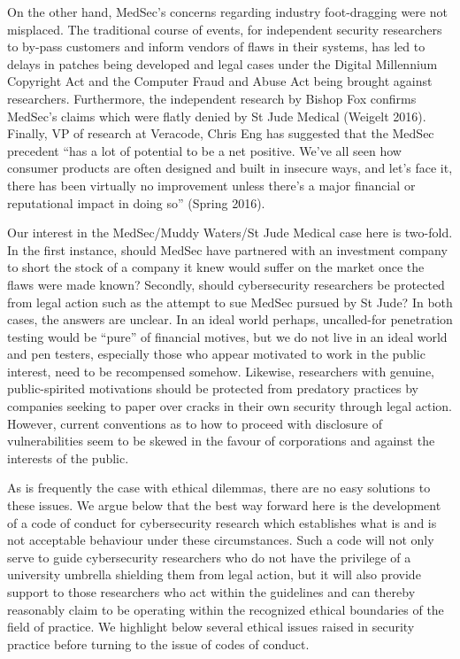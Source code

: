 \documentclass{svjour3}                     %
\begin{document}
On the other hand, MedSec’s concerns regarding industry foot-dragging were not misplaced. The traditional course of events, for independent security researchers to by-pass customers and inform vendors of flaws in their systems, has led to delays in patches being developed and legal cases under the Digital Millennium Copyright Act and the Computer Fraud and Abuse Act being brought against researchers. Furthermore, the independent research by Bishop Fox confirms MedSec’s claims which were flatly denied by St Jude Medical (Weigelt 2016). Finally, VP of research at Veracode, Chris Eng has suggested that the MedSec precedent “has a lot of potential to be a net positive. We’ve all seen how consumer products are often designed and built in insecure ways, and let’s face it, there has been virtually no improvement unless there’s a major financial or reputational impact in doing so” (Spring 2016).

Our interest in the MedSec/Muddy Waters/St Jude Medical case here is two-fold. In the first instance, should MedSec have partnered with an investment company to short the stock of a company it knew would suffer on the market once the flaws were made known? Secondly, should cybersecurity researchers be protected from legal action such as the attempt to sue MedSec pursued by St Jude? In both cases, the answers are unclear. In an ideal world perhaps, uncalled-for penetration testing would be “pure” of financial motives, but we do not live in an ideal world and pen testers, especially those who appear motivated to work in the public interest, need to be recompensed somehow. Likewise, researchers with genuine, public-spirited motivations should be protected from predatory practices by companies seeking to paper over cracks in their own security through legal action. However, current conventions as to how to proceed with disclosure of vulnerabilities seem to be skewed in the favour of corporations and against the interests of the public. 

As is frequently the case with ethical dilemmas, there are no easy solutions to these issues. We argue below that the best way forward here is the development of a code of conduct for cybersecurity research which establishes what is and is not acceptable behaviour under these circumstances. Such a code will not only serve to guide cybersecurity researchers who do not have the privilege of a university umbrella shielding them from legal action, but it will also provide support to those researchers who act within the guidelines and can thereby reasonably claim to be operating within the recognized ethical boundaries of the field of practice. We highlight below several ethical issues raised in security practice before turning to the issue of codes of conduct.
\end{document}
